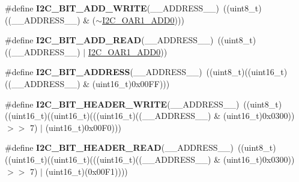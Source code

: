 \begin{DoxyCompactItemize}
\item 
\mbox{\label{group___i2_c___private___macros_gad83949bd18eca67258b05763a90d0128}} 
\#define {\bfseries I2\+C\+\_\+B\+I\+T\+\_\+\+A\+D\+D\+\_\+\+W\+R\+I\+TE}(\+\_\+\+\_\+\+A\+D\+D\+R\+E\+S\+S\+\_\+\+\_\+)~((uint8\+\_\+t)((\+\_\+\+\_\+\+A\+D\+D\+R\+E\+S\+S\+\_\+\+\_\+) \& ($\sim$\mbox{\hyperlink{group___peripheral___registers___bits___definition_ga8b7c20c81f79d17921718412b8fca6d7}{I2\+C\+\_\+\+O\+A\+R1\+\_\+\+A\+D\+D0}})))
\item 
\mbox{\label{group___i2_c___private___macros_gacec6f0d6fde48a24327d2db15387fed8}} 
\#define {\bfseries I2\+C\+\_\+B\+I\+T\+\_\+\+A\+D\+D\+\_\+\+R\+E\+AD}(\+\_\+\+\_\+\+A\+D\+D\+R\+E\+S\+S\+\_\+\+\_\+)~((uint8\+\_\+t)((\+\_\+\+\_\+\+A\+D\+D\+R\+E\+S\+S\+\_\+\+\_\+) $\vert$ \mbox{\hyperlink{group___peripheral___registers___bits___definition_ga8b7c20c81f79d17921718412b8fca6d7}{I2\+C\+\_\+\+O\+A\+R1\+\_\+\+A\+D\+D0}}))
\item 
\mbox{\label{group___i2_c___private___macros_ga51ad2b93ef13577d3d437507e09191cd}} 
\#define {\bfseries I2\+C\+\_\+B\+I\+T\+\_\+\+A\+D\+D\+R\+E\+SS}(\+\_\+\+\_\+\+A\+D\+D\+R\+E\+S\+S\+\_\+\+\_\+)~((uint8\+\_\+t)((uint16\+\_\+t)((\+\_\+\+\_\+\+A\+D\+D\+R\+E\+S\+S\+\_\+\+\_\+) \& (uint16\+\_\+t)0x00\+F\+F)))
\item 
\mbox{\label{group___i2_c___private___macros_ga0edd591eaa2ce5511148bf1ebf533e1a}} 
\#define {\bfseries I2\+C\+\_\+B\+I\+T\+\_\+\+H\+E\+A\+D\+E\+R\+\_\+\+W\+R\+I\+TE}(\+\_\+\+\_\+\+A\+D\+D\+R\+E\+S\+S\+\_\+\+\_\+)~((uint8\+\_\+t)((uint16\+\_\+t)((uint16\+\_\+t)(((uint16\+\_\+t)((\+\_\+\+\_\+\+A\+D\+D\+R\+E\+S\+S\+\_\+\+\_\+) \& (uint16\+\_\+t)0x0300)) $>$$>$ 7) $\vert$ (uint16\+\_\+t)0x00\+F0)))
\item 
\mbox{\label{group___i2_c___private___macros_ga8d833802aafa40a959f62965e498108c}} 
\#define {\bfseries I2\+C\+\_\+B\+I\+T\+\_\+\+H\+E\+A\+D\+E\+R\+\_\+\+R\+E\+AD}(\+\_\+\+\_\+\+A\+D\+D\+R\+E\+S\+S\+\_\+\+\_\+)~((uint8\+\_\+t)((uint16\+\_\+t)((uint16\+\_\+t)(((uint16\+\_\+t)((\+\_\+\+\_\+\+A\+D\+D\+R\+E\+S\+S\+\_\+\+\_\+) \& (uint16\+\_\+t)0x0300)) $>$$>$ 7) $\vert$ (uint16\+\_\+t)(0x00\+F1))))
\item 

\end{DoxyCompactItemize}
